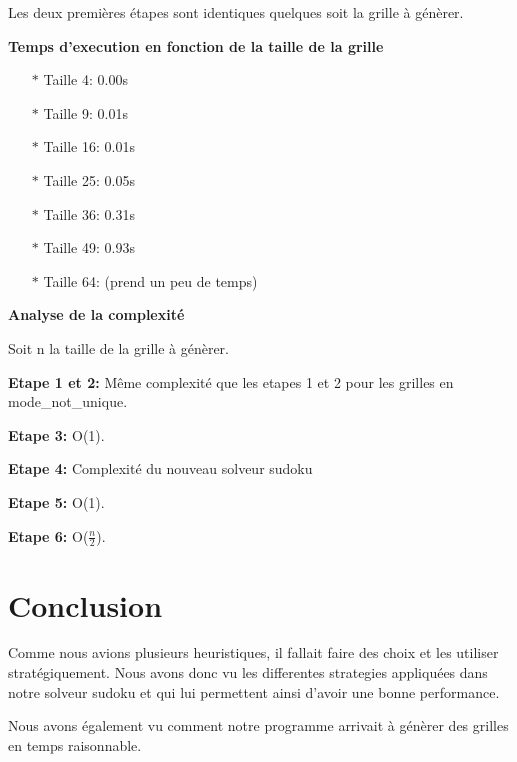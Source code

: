 \documentclass{article}
\begin{document}
Les deux premières étapes sont identiques quelques soit la grille à génèrer. \vspace{0.15cm}

\textbf{Temps d'execution en fonction de la taille de la grille}
\vspace{0.2cm}

\begin{itemize}
    \item[$\ast$] Taille 4: 0.00s \vspace{0.12cm}
    \item[$\ast$] Taille 9: 0.01s \vspace{0.12cm}
    \item[$\ast$] Taille 16: 0.01s \vspace{0.12cm}
    \item[$\ast$] Taille 25: 0.05s \vspace{0.12cm}
    \item[$\ast$] Taille 36: 0.31s \vspace{0.12cm}
    \item[$\ast$] Taille 49: 0.93s \vspace{0.12cm}
    \item[$\ast$] Taille 64: (prend un peu de temps) \vspace{0.12cm}
\end{itemize}
\vspace{0.2cm}

\textbf{Analyse de la complexité}\vspace{0.13cm}

 
Soit n la taille de la grille à génèrer.
\vspace{0.18cm}

\textbf{Etape 1 et 2:} Même complexité que les etapes 1 et 2 pour les grilles en mode\_not\_unique. \vspace{0.15cm}

\textbf{Etape 3:} O(1).\vspace{0.15cm}

\textbf{Etape 4:} Complexité du nouveau solveur sudoku   \vspace{0.15cm}

\textbf{Etape 5:} O(1).\vspace{0.15cm}

\textbf{Etape 6:} O($\frac{n}{2}$).\vspace{0.15cm}

\section{Conclusion}

Comme nous avions plusieurs heuristiques, il fallait faire des choix et les utiliser stratégiquement.
Nous avons donc vu les differentes strategies appliquées dans notre solveur sudoku et qui lui permettent ainsi d'avoir une bonne performance.  

Nous avons également vu comment notre programme arrivait à génèrer des grilles en temps raisonnable.


\printbibliography
\end{document}
